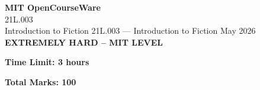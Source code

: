 \documentclass[12pt,a4paper]{exam}
\begin{document}
\begin{center}
{\LARGE \textbf{MIT OpenCourseWare}}\\21L.003\\Introduction to Fiction
\vspace{0.5cm}
{21L.003} --- {Introduction to Fiction}
\vspace{0.3cm}
May 2026
\vspace{0.3cm}
\textbf{EXTREMELY HARD -- MIT LEVEL}
\end{center}

\begin{center}
\textbf{Time Limit: 3 hours}
\end{center}

\begin{center}
\textbf{Total Marks: 100}
\end{center}

\vspace{0.5cm}
\end{document}
